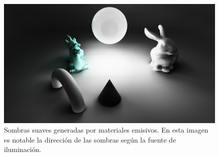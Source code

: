 \begin{figure}[H]
	\centering
	\includegraphics[width=\linewidth]{media/finals/area_shadows.png}
	\caption{Sombras suaves generadas por materiales emisivos. En esta imagen es notable la dirección de las sombras según la fuente de iluminación.}
	\label{fig:areashadows}
\end{figure}
